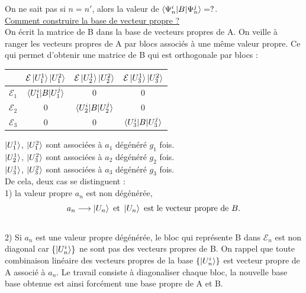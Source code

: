\documentclass[12pt,a4paper,titlepage]{book}
\begin{document}
On ne sait pas si $n = n'$, alors la valeur de $\braket{\Psi_n^i | B | \Psi_n^j} = ?$.\\

\underline{Comment construire la base de vecteur propre ?}\\

On écrit la matrice de B dans la base de vecteurs propres de A. On veille à ranger les vecteurs propres de A par blocs associés à une même valeur propre. Ce qui permet d'obtenir une matrice de B qui est orthogonale par blocs :\\

\begin{table}[h!]
\begin{center}
\label{tab:tableau 1}
\begin{tabular}{c|c|c|c}
 & $\mathcal{E} \ket{U_1^1} \ket{U_1^2}$ & $\mathcal{E} \ket{U_2^1} \ket{U_2^2}$ & $\mathcal{E} \ket{U_3^1} \ket{U_3^2}$\\
 \hline
$\mathcal{E}_1$ & $\braket{U_1^i | B | U_1^j}$ & 0 & 0\\
\hline
$\mathcal{E}_2$ & 0 & $\braket{U_2^i | B | U_2^j}$ & 0\\
\hline
$\mathcal{E}_3$ & 0 & 0 & $\braket{U_3^i | B | U_3^j}$ \\
\end{tabular}
\end{center}
\end{table}

$\ket{U_1^1}$, $\ket{U_1^2}$ sont associées à $a_1$ dégénéré $g_1$ fois.\\
$\ket{U_2^1}$, $\ket{U_3^2}$ sont associées à $a_2$ dégénéré $g_2$ fois.\\
$\ket{U_3^1}$, $\ket{U_3^2}$ sont associées à $a_3$ dégénéré $g_3$ fois.\\

De cela, deux cas se distinguent :\\
1) la valeur propre $a_n$ est non dégénérée,
\begin{equation*}
a_n \longrightarrow \ket{U_n} ~\text{et}~ \ket{U_n} \text{ est le vecteur propre de }B.
\end{equation*}\\
2) Si $a_n$ est une valeur propre dégénérée, le bloc qui représente B dans $\mathcal{E}_n$ est non diagonal car $\lbrace \ket{U_n^i} \rbrace$ ne sont pas des vecteurs propres de B. On rappel que toute combinaison linéaire des vecteurs propres de la base $\lbrace \ket{U_n^i} \rbrace$ est vecteur propre de A associé à $a_n$. Le travail consiste à diagonaliser chaque bloc, la nouvelle base base obtenue est ainsi forcément une base propre de A et B.
\end{document}
